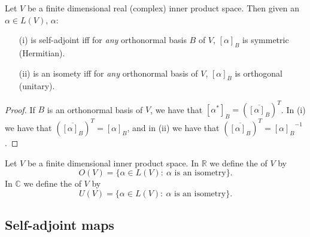 \documentclass[a4paper]{scrartcl}
\begin{document}
\begin{lemma}
      Let $V$ be a finite dimensional real (complex) inner product space. Then given an $\alpha \in L (V)$, $\alpha$:
      \begin{itemize}
           \item[(i)] is self-adjoint iff for \emph{any} orthonormal basis $B$ of $V$, $[\alpha]_B$ is symmetric (Hermitian).
           \item[(ii)] is an isomety iff for \emph{any} orthonormal basis of $V$, $[\alpha]_B$ is orthogonal (unitary).
      \end{itemize}
\end{lemma}
\begin{proof}
      If $B$ is an orthonormal basis of $V$, we have that $[\alpha^*]_B=(\overline{[\alpha]_B})^T $.\newline 
     In (i) we have that $(\overline{[\alpha]_B} )^T=[\alpha]_B$, and in (ii) we have that $(\overline{[\alpha]_B} )^T={[\alpha]_B}^{-1}$.
\end{proof}
\begin{definition}
      Let $V$ be a finite dimensional inner product space.\newline 
     In $\mathbb{R}$ we define the  of $V$ by 
      \[O (V)=\{\alpha \in L (V): \ \alpha \text{ is an isometry} \}.\]
      In $\mathbb{C}$ we define the  of $V$ by 
      \[U (V)=\{\alpha \in L (V): \ \alpha \text{ is an isometry} \}.\]
\end{definition}
\subsection{Self-adjoint maps}
\end{document}
